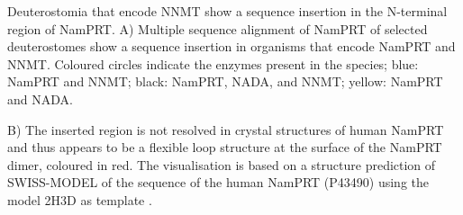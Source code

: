 Deuterostomia that encode NNMT show a sequence insertion in the N-terminal region of NamPRT. A) Multiple sequence alignment of NamPRT of selected deuterostomes show a sequence insertion in organisms that encode NamPRT and NNMT. Coloured circles indicate the enzymes present in the species; blue: NamPRT and NNMT; black: NamPRT, NADA, and NNMT; yellow: NamPRT and NADA.

B) The inserted region is not resolved in crystal structures of human NamPRT and thus appears to be a flexible loop structure at the surface of the NamPRT dimer, coloured in red. The visualisation is based on a structure prediction of SWISS-MODEL \cite{Arnold2006,Biasini2014} of the sequence of the human NamPRT (P43490) using the model 2H3D as template \cite{Wang2006}.
